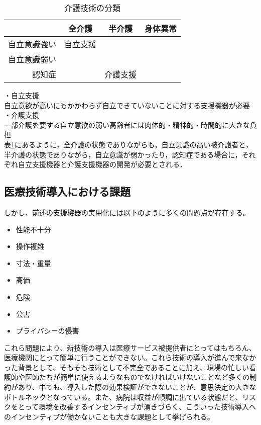 \begin{table}[htb]
  \caption[介護技術の分類]{介護技術の分類}
  \label{tech_classification}
  \centering
  \begin{tabular}{r|c|c|c}
     & 全介護 & 半介護 & 身体異常 \\ \hline
    自立意識強い & 自立支援 & \quad & \quad \\
    自立意識弱い & \quad & \quad &  \quad \\
    認知症 & \quad & 介護支援 & \quad \\
    \end{tabular}
\end{table}

・自立支援 \\
自立意欲が高いにもかかわらず自立できていないことに対する支援機器が必要 \\
・介護支援 \\
一部介護を要する自立意欲の弱い高齢者には肉体的・精神的・時間的に大きな負担 \\
表\ref{tech_classification}にあるように，全介護の状態でありながらも，自立意識の高い被介護者と，半介護の状態でありながら，自立意識が弱かったり，認知症である場合に，それぞれ自立支援機器と介護支援機器の開発が必要とされる．

\subsection{医療技術導入における課題}

しかし、前述の支援機器の実用化には以下のように多くの問題点が存在する。

\begin{itemize}
 \item 性能不十分
 \item 操作複雑
 \item 寸法・重量
 \item 高価
 \item 危険
 \item 公害
 \item プライバシーの侵害
\end{itemize}

これら問題により、新技術の導入は医療サービス被提供者にとってはもちろん、医療機関にとって簡単に行うことができない。これら技術の導入が進んで来なかった背景として、そもそも技術として不完全であることに加え、現場の忙しい看護師や医師たちが簡単に使えるようなものでなければいけないことなど多くの制約があり、中でも、導入した際の効果検証ができないことが、意思決定の大きなボトルネックとなっている。また、病院は収益が順調に出ている状態だと、リスクをとって環境を改善するインセンティブが湧きづらく、こういった技術導入へのインセンティブが働かないことも大きな課題として挙げられる。

